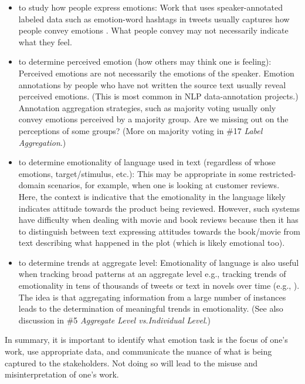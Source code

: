 \documentclass{clv3}
\begin{document}
\begin{itemize}
    \item to study how people express emotions: Work that uses speaker-annotated labeled data such as emotion-word hashtags in tweets usually captures how people convey emotions \cite{mohammad-2012-emotional,purver2012experimenting}. What people convey may not necessarily indicate what they feel.
   \vspace*{-1mm} 
\item to determine perceived emotion (how others may think one is feeling): 
Perceived emotions are not necessarily the emotions of the speaker.
Emotion annotations by people who have not written the source text usually reveal perceived emotions. (This is most common in NLP data-annotation projects.) Annotation aggregation strategies, such as majority voting usually only convey emotions perceived by a majority group. Are we missing out on the perceptions of some groups?  (More on majority voting in \#17 \textit{Label Aggregation}.)
   \vspace*{-1mm} 
\item to determine emotionality of language used in text (regardless of whose emotions, target/stimulus, etc.): This may be appropriate in some restricted-domain scenarios, for example, when one is looking at customer reviews. Here, the context is indicative that the emotionality in the language likely indicates attitude towards the product being reviewed. However, such systems have difficulty when dealing with movie and book reviews because then it has to distinguish between text expressing attitudes towards the book/movie from text describing what happened in the plot (which is likely emotional too).
\vspace*{-1mm}
\item to determine trends at aggregate level: Emotionality of language is also useful when tracking broad patterns at an aggregate level e.g., tracking trends of emotionality in tens of thousands of tweets or text in novels over time (e.g., \citet{paul2011you,mohammad-2011-upon,10.1145/2145204.2145347}). The idea is that aggregating information from a large number of instances leads to the determination of meaningful trends in emotionality. (See also discussion in \#5 \textit{Aggregate Level vs.\@ Individual Level}.)
\end{itemize}
\vspace*{-3mm}
\noindent In summary, it is important to identify what emotion task is the focus of one's work, use appropriate data, and communicate the nuance of what is being captured to the stakeholders. Not doing so will lead to the misuse and misinterpretation of one’s work.
\end{document}
